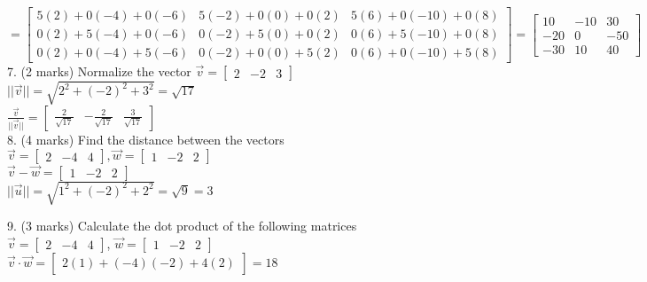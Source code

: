 \documentclass[a4paper]{article}
\begin{document}
$=\begin{bmatrix}
5(2)+0(-4)+0(-6)&5(-2)+0(0)+0(2)&5(6)+0(-10)+0(8)\\
0(2)+5(-4)+0(-6)&0(-2)+5(0)+0(2)&0(6)+5(-10)+0(8)\\
0(2)+0(-4)+5(-6)&0(-2)+0(0)+5(2)&0(6)+0(-10)+5(8)
\end{bmatrix} = \begin{bmatrix}
10&-10&30\\
-20&0&-50\\
-30&10&40
\end{bmatrix}$\\

7. (2 marks) Normalize the vector $\vec{v} = \begin{bmatrix}
2&-2&3
\end{bmatrix}$\\
$||\vec{v}|| = \sqrt{2^2+(-2)^2+3^2} = \sqrt{17}$\\
$\frac{\vec{v}}{||\vec{v}||} = \begin{bmatrix}
\frac{2}{\sqrt{17}}&-\frac{2}{\sqrt{17}}&\frac{3}{\sqrt{17}}
\end{bmatrix}$\\

8. (4 marks) Find the distance between the vectors $\vec{v} = \begin{bmatrix}
2&-4&4
\end{bmatrix}, \vec{w} = \begin{bmatrix}
1&-2&2
\end{bmatrix}$\\
$\vec{v}-\vec{w} = \begin{bmatrix}
1&-2&2
\end{bmatrix}$\\
$||\vec{u}|| = \sqrt{1^2+(-2)^2+2^2} = \sqrt{9} = 3$

9. (3 marks) Calculate the dot product of the following matrices $\vec{v} = \begin{bmatrix}
2&-4&4
\end{bmatrix}$, $\vec{w} = \begin{bmatrix}
1&-2&2
\end{bmatrix}$\\
$\vec{v} \cdot \vec{w} = \begin{bmatrix}
2(1)+(-4)(-2)+4(2)
\end{bmatrix} = 18$\\
\end{document}
